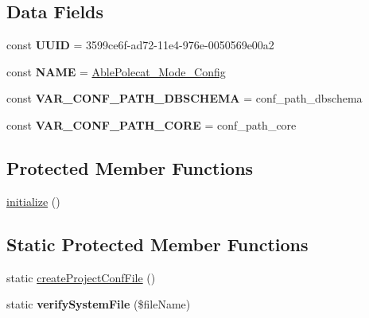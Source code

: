 \subsection*{Data Fields}
\begin{DoxyCompactItemize}
\item 
\hypertarget{class_able_polecat___mode___config_a74b892c8c0b86bf9d04c5819898c51e7}{}const {\bfseries U\+U\+I\+D} = \textquotesingle{}3599ce6f-\/ad72-\/11e4-\/976e-\/0050569e00a2\textquotesingle{}\label{class_able_polecat___mode___config_a74b892c8c0b86bf9d04c5819898c51e7}

\item 
\hypertarget{class_able_polecat___mode___config_a244352f035b82b20b0efa506167fd862}{}const {\bfseries N\+A\+M\+E} = \textquotesingle{}\hyperlink{class_able_polecat___mode___config}{Able\+Polecat\+\_\+\+Mode\+\_\+\+Config}\textquotesingle{}\label{class_able_polecat___mode___config_a244352f035b82b20b0efa506167fd862}

\item 
\hypertarget{class_able_polecat___mode___config_aa86f4209b3df743489a5ce15779f72bc}{}const {\bfseries V\+A\+R\+\_\+\+C\+O\+N\+F\+\_\+\+P\+A\+T\+H\+\_\+\+D\+B\+S\+C\+H\+E\+M\+A} = \textquotesingle{}conf\+\_\+path\+\_\+dbschema\textquotesingle{}\label{class_able_polecat___mode___config_aa86f4209b3df743489a5ce15779f72bc}

\item 
\hypertarget{class_able_polecat___mode___config_addb454daba30e451ab36fb5b6c9a86c0}{}const {\bfseries V\+A\+R\+\_\+\+C\+O\+N\+F\+\_\+\+P\+A\+T\+H\+\_\+\+C\+O\+R\+E} = \textquotesingle{}conf\+\_\+path\+\_\+core\textquotesingle{}\label{class_able_polecat___mode___config_addb454daba30e451ab36fb5b6c9a86c0}

\end{DoxyCompactItemize}
\subsection*{Protected Member Functions}
\begin{DoxyCompactItemize}
\item 
\hyperlink{class_able_polecat___mode___config_a72c6b8404d84cd04a0a5ec7bc0d68ee7}{initialize} ()
\end{DoxyCompactItemize}
\subsection*{Static Protected Member Functions}
\begin{DoxyCompactItemize}
\item 
static \hyperlink{class_able_polecat___mode___config_a6a9eed480560ff670525c846bc1889c4}{create\+Project\+Conf\+File} ()
\item 
\hypertarget{class_able_polecat___mode___config_ad71ffa97a69e9de063c3420bec938665}{}static {\bfseries verify\+System\+File} (\$file\+Name)\label{class_able_polecat___mode___config_ad71ffa97a69e9de063c3420bec938665}

\end{DoxyCompactItemize}


